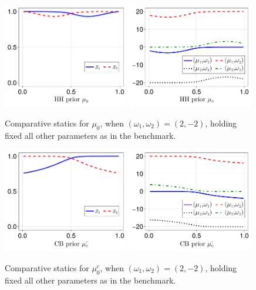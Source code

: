 \documentclass[12pt,a4paper]{article}
\begin{document}
\begin{figure}[H]
\centering
\includegraphics[width=0.49\textwidth]{figures/V8/γ_10/fig_optimal_π_across_μ_0_ω_1_2_ω_2_-2_δ_0.5_.pdf}
\includegraphics[width=0.49\textwidth]{figures/V8/γ_10/fig_posterior_across_μ_0_ω_1_2_ω_2_-2_δ_0.5_.pdf}
\caption{Comparative statics for $\mu_0$, when $(\omega_1,\omega_2)=(2,-2)$, holding fixed all other parameters as in the benchmark.}
\label{FigureA5}
\end{figure}

\begin{figure}[H]
\centering
\includegraphics[width=0.49\textwidth]{figures/V8/γ_10/fig_optimal_π_across_μ_0_c_ω_1_2_ω_2_-2_δ_0.5_.pdf}
\includegraphics[width=0.49\textwidth]{figures/V8/γ_10/fig_posterior_across_μ_0_c_ω_1_2_ω_2_-2_δ_0.5_.pdf}
\caption{Comparative statics for $\mu_0^c$, when $(\omega_1,\omega_2)=(2,-2)$, holding fixed all other parameters as in the benchmark.}
\label{FigureA6}
\end{figure}
\end{document}
